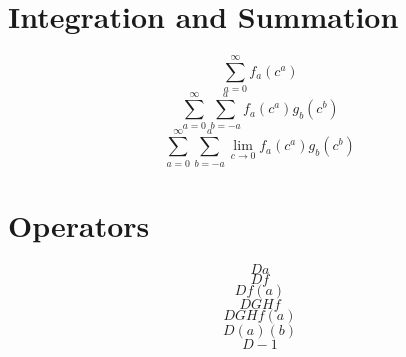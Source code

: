 \documentclass{article}
\begin{document}
\section{Integration and Summation}
\[ \sum_{a=0}^\infty f_a(c^a) \]
\[ \sum_{a=0}^\infty \sum_{b=-a}^a f_a(c^a) g_b(c^b) \]
\[ \sum_{a=0}^\infty \sum_{b=-a}^a \lim_{c\rightarrow 0} f_a(c^a) g_b(c^b) \]

\section{Operators}
\[  D a \]
\[  D f \]
\[  D f(a) \]
\[  D G H f \]
\[  D G H f (a) \]
\[  D (a) (b) \]
\[ D -1 \]
\end{document}
